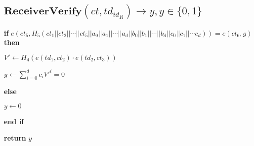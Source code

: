 \documentclass[a4paper]{article}
\begin{document}
\subsection{$\textbf{ReceiverVerify}(\textit{ct}, \textit{td}_{\textit{id}_R}) \rightarrow y, y \in \{0, 1\}$}

\textbf{if} $e(\textit{ct}_5, H_5(\textit{ct}_1 || \textit{ct}_2 || \cdots || \textit{ct}_5 || a_0 || a_1 || \cdots || a_d || b_0 || b_1 || \cdots || b_d || c_0 || c_1 || \cdots c_d)) = e(\textit{ct}_6, g)$ \textbf{then}

\quad$V' \gets H_4(e(\textit{td}_1, \textit{ct}_2) \cdot e(\textit{td}_2, \textit{ct}_3))$

\quad$y \gets \sum\limits_{i = 0}^d c_i V'^i = 0$

\textbf{else}

\quad$y \gets 0$

\textbf{end if}

\textbf{return} $y$
\end{document}
